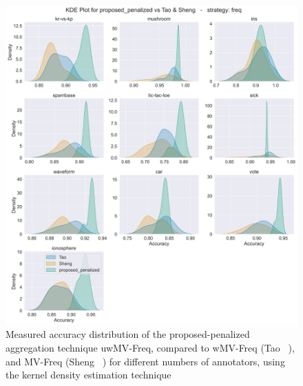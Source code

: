 \documentclass[pdflatex,bst/sn-basic]{bst/sn-jnl}%
\begin{document}
\begin{figure}[!htbp]
    \centering
    \includegraphics[width=\textwidth]{figures/image7.png}
    \caption{{Measured accuracy distribution of the proposed-penalized aggregation technique uwMV-Freq, compared to wMV-Freq (Tao \unskip~\protect\cite{tao_Label_2020}), and MV-Freq (Sheng \unskip~\protect\cite{sheng_Majority_2019}) for different numbers of annotators, using the kernel density estimation technique}}
    \label{crowd.Fig.5.confidencescore-beta}
\end{figure}
\end{document}
